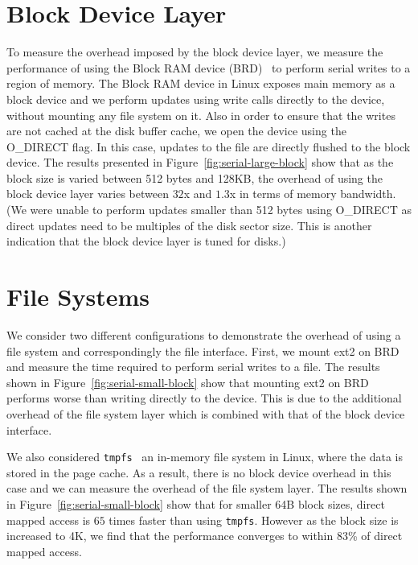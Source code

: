 \section{Block Device Layer}
To measure the overhead imposed by the block device layer, we measure
the performance of using the Block RAM device (BRD)~\cite{brd-linux}
to perform serial writes to a region of memory. The Block RAM device
in Linux exposes main memory as a block device and we perform updates
using write calls directly to the device, without mounting any
file system on it. Also in order to ensure that the writes are not
cached at the disk buffer cache, we open the device using the
O\_DIRECT flag. In this case, updates to the file are directly flushed
to the block device. The results presented in
Figure~\ref{fig:serial-large-block} show that as the block size is
varied between 512 bytes and 128KB, the overhead of using the block
device layer varies between $32$x and $1.3$x in terms of memory
bandwidth. (We were unable to perform updates smaller than 512 bytes
using O\_DIRECT as direct updates need to be multiples of the disk
sector size. This is another indication that the block device layer is
tuned for disks.)

\section{File Systems}
We consider two different configurations to demonstrate the overhead
of using a file system and correspondingly the file interface. First,
we mount ext2 on BRD and measure the time required to perform serial
writes to a file. The results shown in
Figure~\ref{fig:serial-small-block} show that mounting ext2 on BRD
performs worse than writing directly to the device. This is due to the
additional overhead of the file system layer which is combined with
that of the block device interface.

We also considered \texttt{tmpfs}~\cite{tmpfs} an in-memory file
system in Linux, where the data is stored in the page cache. As a
result, there is no block device overhead in this case and we can
measure the overhead of the file system layer. The results shown in
Figure~\ref{fig:serial-small-block} show that for smaller 64B block sizes,
direct mapped access is $65$ times faster than using
\texttt{tmpfs}. However as the block size is increased to 4K, we find
that the performance converges to within 83\% of direct mapped
access.

